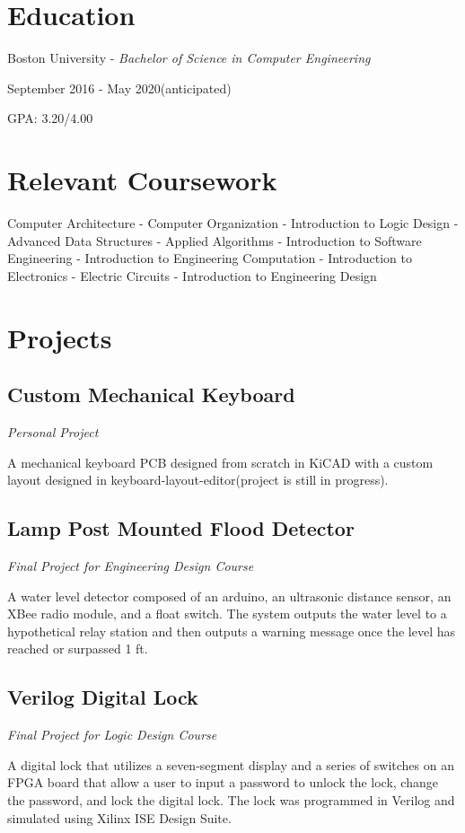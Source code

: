 \documentclass{article}
\begin{document}
\section{Education}
Boston University - \textit{Bachelor of Science in Computer Engineering}

September 2016 - May 2020(anticipated)

GPA: 3.20/4.00

\section{Relevant Coursework}
Computer Architecture - Computer Organization - Introduction to Logic Design - Advanced Data Structures - Applied Algorithms - Introduction to Software Engineering - Introduction to Engineering Computation - Introduction to Electronics - Electric Circuits - Introduction to Engineering Design

\section{Projects}
\subsection{Custom Mechanical Keyboard} \textit{Personal Project}

A mechanical keyboard PCB designed from scratch in KiCAD with a custom layout designed in keyboard-layout-editor(project is still in progress).
\subsection{Lamp Post Mounted Flood Detector} \textit{Final Project for Engineering Design Course}

A water level detector composed of an arduino, an ultrasonic distance sensor, an XBee radio module, and a float switch. The system outputs the water level to a hypothetical relay station and then outputs a warning message once the level has reached or surpassed 1 ft.
\subsection{Verilog Digital Lock} \textit{Final Project for Logic Design Course}

A digital lock that utilizes a seven-segment display and a series of switches on an FPGA board that allow a user to input a password to unlock the lock, change the password, and lock the digital lock. The lock was programmed in Verilog and simulated using Xilinx ISE Design Suite.
\end{document}
